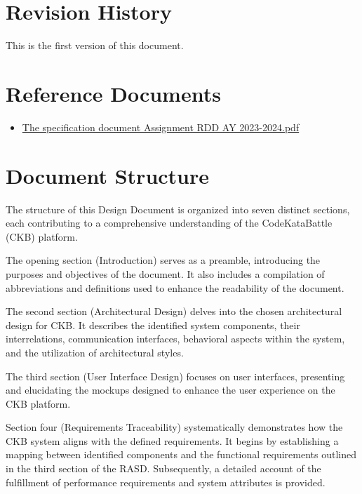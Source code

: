 \section{Revision History}
\label{sec:revision_history}
This is the first version of this document.

\section{Reference Documents}
\label{sec:reference_documents}%
\begin{itemize}
    \item \href{https://polimi365-my.sharepoint.com/:b:/g/personal/10710351_polimi_it/EZXUPFfeFKdBkf5M8W-EBYgB2JrrVLr23BYJ4MXQ7kzUkA?e=o0wvyw}{The specification document Assignment RDD AY 2023-2024.pdf}
\end{itemize}

\section{Document Structure}
\label{sec:document_structure}

The structure of this Design Document is organized into seven distinct sections, each contributing to a comprehensive understanding of the CodeKataBattle (CKB) platform.

The opening section (Introduction) serves as a preamble, introducing the purposes and objectives of the document. 
It also includes a compilation of abbreviations and definitions used to enhance the readability of the document.

The second section (Architectural Design) delves into the chosen architectural design for CKB. 
It describes the identified system components, their interrelations, communication interfaces, behavioral aspects within the system, and the utilization of architectural styles.

The third section (User Interface Design) focuses on user interfaces, presenting and elucidating the mockups designed to enhance the user experience on the CKB platform.

Section four (Requirements Traceability) systematically demonstrates how the CKB system aligns with the defined requirements. 
It begins by establishing a mapping between identified components and the functional requirements outlined in the third section of the RASD. 
Subsequently, a detailed account of the fulfillment of performance requirements and system attributes is provided.

